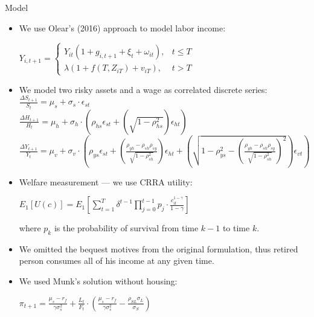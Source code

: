 \documentclass{beamer}
\begin{document}
\begin{frame}[allowframebreaks]{Model}
  \begin{itemize}
	\item We use Olear's (2016) approach to model labor income:

\begin{center}
	$Y_{i,t+1} = 
	\begin{cases}
		Y_{it} (1 + g_{i,t+1} + \xi_t + \omega_{it}), & t \leq T \\
		\lambda (1 + f(T, Z_{iT}) + v_{iT}), & t > T
	\end{cases}	
	$
\end{center}

	\item We model two risky assets and a wage as correlated discrete series:\\
$\frac{\Delta S_{t+1}}{S_t} = \mu_s + \sigma_s \cdot \epsilon_{st}$\\
$\frac{\Delta H_{t+1}}{H_t} = \mu_h + \sigma_h \cdot \left(\rho_{hs}\epsilon_{st} + (\sqrt{1-\rho^2_{hs}})\epsilon_{ht}\right)$\\
$\frac{\Delta Y_{t+1}}{Y_t} = \mu_v + \sigma_v \cdot \left(\rho_{ys}\epsilon_{st} + \left(\frac{\rho_{yh} - \rho_{sh}\rho_{sy}}{\sqrt{1-\rho^2_{sh}}}\right)\epsilon_{ht} + \left(\sqrt{1-\rho^2_{ys}-(\frac{\rho_{yh} - \rho_{sh}\rho_{sy}}{\sqrt{1-\rho^2_{sh}}})^2}\right)\epsilon_{vt}\right)$

\framebreak

	\item Welfare measurement --- we use CRRA utility:

\begin{center}
	$E_1[U(c)] = E_1 \left[\displaystyle\sum^T_{t=1} \delta^{t-1} \displaystyle\prod^{t-1}_{j=0} p_j \cdot \frac{c^{1-\gamma}_{it}}{1-\gamma}\right]$
\end{center}

where $p_k$ is the probability of survival from time $k-1$ to time $k$.

	\item We omitted the bequest motives from the original formulation, thus retired person consumes all of his income at any given time.

\framebreak

	\item We used Munk's solution without housing:

\begin{center}
	$\pi_{t+1} = \frac{\mu_s - r_f}{\gamma \sigma^2_s}  + \frac{L_t}{F_t} \cdot \left(\frac{\mu_s - r_f}{\gamma \sigma^2_s} - \frac{\rho_{SL}\sigma_L}{\sigma_S} \right)$
\end{center}


\end{itemize}
\end{frame}
\end{document}
